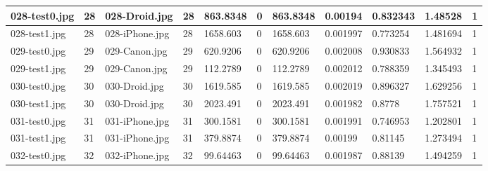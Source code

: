 \begin{landscape}
\begin{longtable}{|p{2cm}|p{1cm}|p{2cm}|p{1cm}|p{2cm}|p{1cm}|p{2cm}|p{2cm}|p{2cm}|p{2cm}|p{1cm}|}
		028-test0.jpg   & 28               & 028-Droid.jpg         & 28                          & 863.8348              & 0                       & 863.8348                   & 0.00194               & 0.832343              & 1.48528                  & 1                \\ \hline
		028-test1.jpg   & 28               & 028-iPhone.jpg        & 28                          & 1658.603              & 0                       & 1658.603                   & 0.001997              & 0.773254              & 1.481694                 & 1                \\ \hline
		029-test0.jpg   & 29               & 029-Canon.jpg         & 29                          & 620.9206              & 0                       & 620.9206                   & 0.002008              & 0.930833              & 1.564932                 & 1                \\ \hline
		029-test1.jpg   & 29               & 029-Canon.jpg         & 29                          & 112.2789              & 0                       & 112.2789                   & 0.002012              & 0.788359              & 1.345493                 & 1                \\ \hline
		030-test0.jpg   & 30               & 030-Droid.jpg         & 30                          & 1619.585              & 0                       & 1619.585                   & 0.002019              & 0.896327              & 1.629256                 & 1                \\ \hline
		030-test1.jpg   & 30               & 030-Droid.jpg         & 30                          & 2023.491              & 0                       & 2023.491                   & 0.001982              & 0.8778                & 1.757521                 & 1                \\ \hline
		031-test0.jpg   & 31               & 031-iPhone.jpg        & 31                          & 300.1581              & 0                       & 300.1581                   & 0.001991              & 0.746953              & 1.202801                 & 1                \\ \hline
		031-test1.jpg   & 31               & 031-iPhone.jpg        & 31                          & 379.8874              & 0                       & 379.8874                   & 0.00199               & 0.81145               & 1.273494                 & 1                \\ \hline
		032-test0.jpg   & 32               & 032-iPhone.jpg        & 32                          & 99.64463              & 0                       & 99.64463                   & 0.001987              & 0.88139               & 1.494259                 & 1                \\ \hline

\end{longtable}
\end{landscape}

